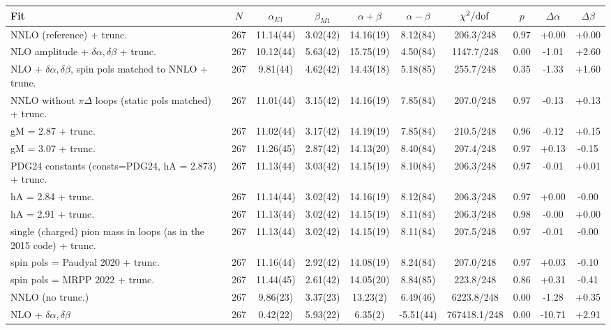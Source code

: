 \begin{tabular}{lccccccccc}
\hline
Fit & $N$ & $\alpha_{E1}$ & $\beta_{M1}$ & $\alpha+\beta$ & $\alpha-\beta$ & $\chi^2/{\rm dof}$ & $p$ & $\Delta\alpha$ & $\Delta\beta$ \\
\hline
NNLO (reference) + trunc. & 267 & 11.14(44) & 3.02(42) & 14.16(19) & 8.12(84) & 206.3/248 & 0.97 & +0.00 & +0.00 \\
NLO amplitude + $\delta\alpha,\delta\beta$ + trunc. & 267 & 10.12(44) & 5.63(42) & 15.75(19) & 4.50(84) & 1147.7/248 & 0.00 & -1.01 & +2.60 \\
NLO + $\delta\alpha,\delta\beta$, spin pols matched to NNLO + trunc. & 267 & 9.81(44) & 4.62(42) & 14.43(18) & 5.18(85) & 255.7/248 & 0.35 & -1.33 & +1.60 \\
NNLO without $\pi\Delta$ loops (static pols matched) + trunc. & 267 & 11.01(44) & 3.15(42) & 14.16(19) & 7.85(84) & 207.0/248 & 0.97 & -0.13 & +0.13 \\
gM = 2.87 + trunc. & 267 & 11.02(44) & 3.17(42) & 14.19(19) & 7.85(84) & 210.5/248 & 0.96 & -0.12 & +0.15 \\
gM = 3.07 + trunc. & 267 & 11.26(45) & 2.87(42) & 14.13(20) & 8.40(84) & 207.4/248 & 0.97 & +0.13 & -0.15 \\
PDG24 constants (consts=PDG24, hA = 2.873) + trunc. & 267 & 11.13(44) & 3.03(42) & 14.15(19) & 8.10(84) & 206.3/248 & 0.97 & -0.01 & +0.01 \\
hA = 2.84 + trunc. & 267 & 11.14(44) & 3.02(42) & 14.16(19) & 8.12(84) & 206.3/248 & 0.97 & +0.00 & -0.00 \\
hA = 2.91 + trunc. & 267 & 11.13(44) & 3.02(42) & 14.15(19) & 8.11(84) & 206.3/248 & 0.98 & -0.00 & +0.00 \\
single (charged) pion mass in loops (as in the 2015 code) + trunc. & 267 & 11.13(44) & 3.02(42) & 14.15(19) & 8.11(84) & 207.5/248 & 0.97 & -0.01 & -0.00 \\
spin pols = Paudyal 2020 + trunc. & 267 & 11.16(44) & 2.92(42) & 14.08(19) & 8.24(84) & 207.0/248 & 0.97 & +0.03 & -0.10 \\
spin pols = MRPP 2022 + trunc. & 267 & 11.44(45) & 2.61(42) & 14.05(20) & 8.84(85) & 223.8/248 & 0.86 & +0.31 & -0.41 \\
NNLO (no trunc.) & 267 & 9.86(23) & 3.37(23) & 13.23(2) & 6.49(46) & 6223.8/248 & 0.00 & -1.28 & +0.35 \\
NLO + $\delta\alpha,\delta\beta$ & 267 & 0.42(22) & 5.93(22) & 6.35(2) & -5.51(44) & 767418.1/248 & 0.00 & -10.71 & +2.91 \\

\end{tabular}
